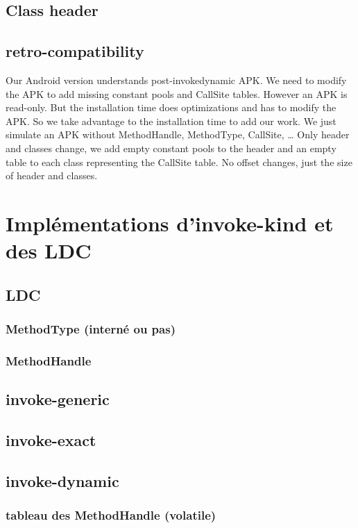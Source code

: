 \documentclass{sigplanconf}
\def \ANDROID{\mbox{Android}\xspace}
\begin{document}
  \subsection{Class header}
  \subsection{retro-compatibility}
    Our \ANDROID version understands post-invokedynamic APK.
    We need to modify the APK to add missing constant pools and CallSite tables.
    However an APK is read-only.
    But the installation time does optimizations and has to modify the APK.
    So we take advantage to the installation time to add our work.
    We just simulate an APK without MethodHandle, MethodType, CallSite, \dots
    Only header and classes change, we add empty constant pools to the header
    and an empty table to each class representing the CallSite table.
    No offset changes, just the size of header and classes.

\section{Impl\'ementations d'invoke-kind et des LDC}

  \subsection{LDC}

    \subsubsection{MethodType (intern\'e ou pas)}
    \subsubsection{MethodHandle}

  \subsection{invoke-generic}
  \subsection{invoke-exact}
  \subsection{invoke-dynamic}

    \subsubsection{tableau des MethodHandle (volatile)}
\end{document}
